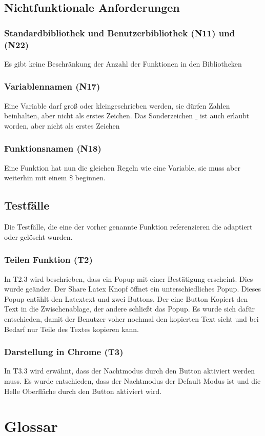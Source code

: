 \documentclass[parskip=full,11pt,twoside]{scrartcl}
\begin{document}
\subsection{Nichtfunktionale Anforderungen}

\subsubsection{Standardbibliothek und Benutzerbibliothek (N11) und (N22)}
	Es gibt keine Beschränkung der Anzahl der Funktionen in den Bibliotheken
\subsubsection{Variablennamen (N17)}
	Eine Variable darf groß oder kleingeschrieben werden, sie dürfen Zahlen
	beinhalten, aber nicht als erstes Zeichen.
	Das Sonderzeichen $\_ $ ist auch erlaubt worden, aber nicht als erstes Zeichen 
\subsubsection{Funktionsnamen (N18)}
	Eine Funktion hat nun die gleichen Regeln wie eine Variable, sie muss aber 
	weiterhin mit einem $\$$ beginnen.
	
\subsection{Testfälle}
	Die Testfälle, die eine der vorher genannte Funktion referenzieren die adaptiert oder
	gelöscht wurden.
\subsubsection{Teilen Funktion (T2)}
	In T2.3 wird beschrieben, dass ein Popup mit einer Bestätigung erscheint.
	Dies wurde geänder.
	Der Share Latex Knopf öffnet ein unterschiedliches Popup.
	Dieses Popup entählt den Latextext und zwei Buttons.
	Der eine Button Kopiert den Text in die Zwischenablage, der andere
	schließt das Popup.
	Es wurde sich dafür entschieden, damit der Benutzer voher nochmal den
	kopierten Text sieht und bei Bedarf nur Teile des Textes kopieren kann.
	
\subsubsection{Darstellung in Chrome (T3)}
	In T3.3 wird erwähnt, dass der Nachtmodus durch den Button aktiviert werden muss.
	Es wurde entschieden, dass der Nachtmodus der Default Modus ist und die Helle
	Oberfläche durch den Button aktiviert wird.
\section{Glossar}
\end{document}
